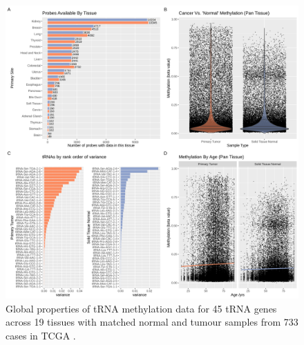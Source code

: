 \documentclass[
]{book}
\begin{document}
\begin{figure}

{\centering \includegraphics[width=1\linewidth]{./figs/cancerVsNormalCombinedPlots} 

}

\caption{Global properties of tRNA methylation data for 45 tRNA genes across 19 tissues with matched normal and tumour samples from 733 cases in TCGA \citep{Yang2016, Nazor2012}.}\label{fig:cancerVsNormalCombinedPlots}
\end{figure}
\end{document}
